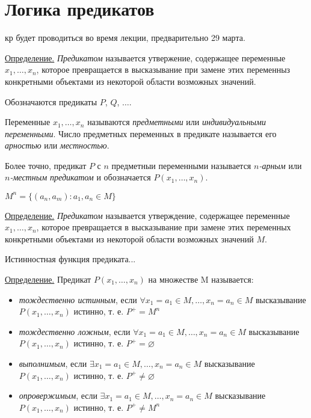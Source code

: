 \documentclass[otchet]{SCWorks}
\begin{document}
\section{Логика предикатов}
кр будет проводиться во время лекции, предварительно 29 марта.
\par \underline{Определение.} {\it Предикатом} называется утвержение, содержащее переменные $x_1,\dots,x_n$, которое превращается в высказывание при замене этих переменныз конкретными объектами из некоторой области возможных значений.
\par Обозначаются предикаты $P$, $Q$, $\dots$.
\par Переменные $x_1,\dots,x_n$ называются {\it предметными} или {\it индивидуальными переменными}. Число предметных переменных в предикате называется его {\it арностью} или {\it местностью}.
\par Более точно, предикат $P$ с $n$ предметныи переменными называется {\it $n$-арным} или {\it $n$-местным предикатом} и обозначается $P(x_1,\dots,x_n)$.
\par $M^n = \{(a_n, a_m): a_1, a_n \in M \}$
\par \underline{Определение.} {\it Предикатом} называется утверждение, содержащее переменные $x_1, \dots, x_n$, которое превращается в высказывание при замене этих переменных конкретными объектами из некоторой области возможных значений $M$.
\par Истинностная функция предиката...
\par \underline{Определение.} Предикат $P(x_1, \dots, x_n)$ на множестве M называется:
\begin{itemize}
    \item {\it тождественно истинным}, если $\forall x_1 = a_1 \in M, \dots, x_n = a_n \in M$ высказывание $P(x_1, \dots, x_n)$ истинно, т. е. $P^+ = M^n$
    \item {\it тождественно ложным}, если $\forall x_1 = a_1 \in M, \dots, x_n = a_n \in M$ высказывание $P(x_1, \dots, x_n)$ истинно, т. е. $P^+ = \varnothing$
    \item {\it выполнимым}, если $\exists x_1 = a_1 \in M, \dots, x_n = a_n \in M$ высказывание $P(x_1, \dots, x_n)$ истинно, т. е. $P^+ \neq \varnothing$
    \item {\it опровержимым}, если $\exists x_1 = a_1 \in M, \dots, x_n = a_n \in M$ высказывание $P(x_1, \dots, x_n)$ истинно, т. е. $P^+ \neq M^n$
\end{itemize}
\end{document}

